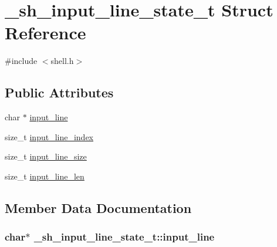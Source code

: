 \hypertarget{struct__sh__input__line__state__t}{}\section{\+\_\+sh\+\_\+input\+\_\+line\+\_\+state\+\_\+t Struct Reference}
\label{struct__sh__input__line__state__t}


{\ttfamily \#include $<$shell.\+h$>$}

\subsection*{Public Attributes}
\begin{DoxyCompactItemize}
\item 
char $\ast$ \hyperlink{struct__sh__input__line__state__t_a14ffaf4912c52b6f51062abd212a9dca}{input\+\_\+line}
\item 
size\+\_\+t \hyperlink{struct__sh__input__line__state__t_a626a3b68fc1a7ed86f564ff3163e3fed}{input\+\_\+line\+\_\+index}
\item 
size\+\_\+t \hyperlink{struct__sh__input__line__state__t_adf192ec5f0d04a9b1d49906b03ea6d5c}{input\+\_\+line\+\_\+size}
\item 
size\+\_\+t \hyperlink{struct__sh__input__line__state__t_a6091ac0aaaa9a7866f28b13ec406e6e2}{input\+\_\+line\+\_\+len}
\end{DoxyCompactItemize}


\subsection{Member Data Documentation}
\subsubsection[{\texorpdfstring{input\+\_\+line}{input_line}}]{\setlength{\rightskip}{0pt plus 5cm}char$\ast$ \+\_\+sh\+\_\+input\+\_\+line\+\_\+state\+\_\+t\+::input\+\_\+line}\hypertarget{struct__sh__input__line__state__t_a14ffaf4912c52b6f51062abd212a9dca}{}\label{struct__sh__input__line__state__t_a14ffaf4912c52b6f51062abd212a9dca}
